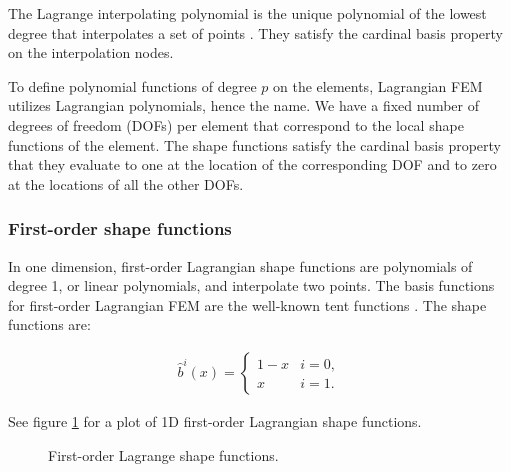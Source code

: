 The Lagrange interpolating polynomial is the unique
polynomial of the lowest degree that interpolates a set of points \cite{hiptmair_numerical_2020}.
They satisfy the cardinal basis property on the interpolation nodes.

To define polynomial functions of degree $p$ on the elements, Lagrangian FEM utilizes
Lagrangian polynomials, hence the name.
We have a fixed number of degrees of freedom (DOFs) per element that correspond to the
local shape functions of the element.
The shape functions satisfy the cardinal basis property that they evaluate to one
at the location of the corresponding DOF and to zero at the locations of all the other DOFs.

\subsubsection{First-order shape functions}

In one dimension, first-order Lagrangian shape functions are polynomials of degree 1,
or linear polynomials, and interpolate two points.
The basis functions for first-order Lagrangian FEM are the well-known tent functions \cite{hiptmair_numerical_2023}.
The shape functions are:

\begin{align}
    \hat{b}^i(x) = \begin{cases}
                       1 - x & i=0, \\
                       x     & i=1.
                   \end{cases}
\end{align}

See figure \ref{fig:1_lagrange_1d} for a plot of 1D first-order Lagrangian shape functions.

\begin{figure}[h]
    \centering
    \caption{First-order Lagrange shape functions.}
    \label{fig:1_lagrange_1d}
\end{figure}

